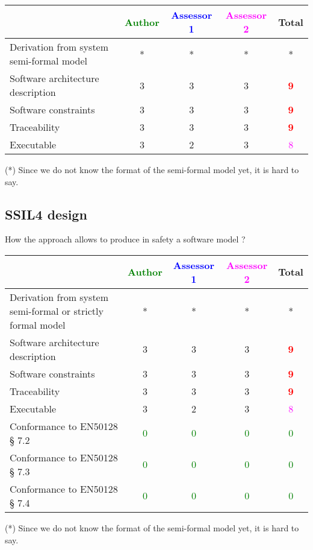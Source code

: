 \begin{tabular}{|l | c | c | c | c|}
\hline
& \textcolor{green}{Author} & \textcolor{blue}{Assessor 1} & \textcolor{magenta}{Assessor 2} & Total \\
\hline
Derivation from system semi-formal model  &* &* & *& * \\
\hline 
Software architecture description  &3 &3 & 3    & \textcolor{red}{\textbf{9}} \\
\hline
Software constraints  &3 &3 & 3    & \textcolor{red}{\textbf{9}} \\
\hline
Traceability  &3 &3 & 3    & \textcolor{red}{\textbf{9}} \\
\hline
Executable  &3 &2 & 3    & \textcolor{magenta}{8} \\
\hline
\end{tabular}
\begin{author_comment}
(*) Since we do not know the format of the semi-formal model  yet, it is hard to say.
\end{author_comment}

\subsection{SSIL4 design}

How the approach allows to  produce in safety a software model ?

\begin{tabular}{|l | c | c | c | c|}
\hline
& \textcolor{green}{Author} & \textcolor{blue}{Assessor 1} & \textcolor{magenta}{Assessor 2} & Total \\
\hline
Derivation from system semi-formal or strictly formal model  &* &* & *& * \\
\hline 
Software architecture description  &3 &3 & 3    & \textcolor{red}{\textbf{9}} \\
\hline
Software constraints  &3 &3 & 3    & \textcolor{red}{\textbf{9}} \\
\hline
Traceability  &3 &3 & 3    & \textcolor{red}{\textbf{9}} \\
\hline
Executable  &3 &2 & 3    & \textcolor{magenta}{8} \\
\hline
Conformance to EN50128 § 7.2  & \textcolor{green}{0}   & \textcolor{green}{0}   & \textcolor{green}{0} & \textcolor{green}{0} \\
\hline
Conformance to EN50128 § 7.3  & \textcolor{green}{0}   & \textcolor{green}{0}   & \textcolor{green}{0} & \textcolor{green}{0} \\
\hline
Conformance to EN50128 § 7.4  & \textcolor{green}{0}   & \textcolor{green}{0}   & \textcolor{green}{0} & \textcolor{green}{0} \\
\hline
\end{tabular}
\begin{author_comment}
(*) Since we do not know the format of the semi-formal model  yet, it is hard to say.
\end{author_comment}

